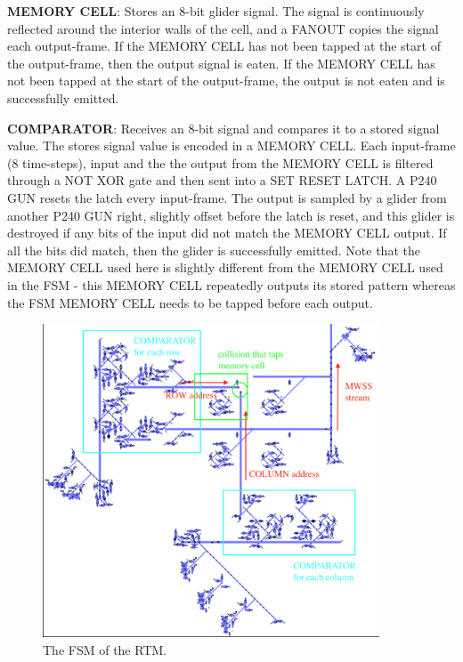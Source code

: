 \documentclass{article}
\begin{document}
\vspace{1em}

\noindent\textbf{MEMORY CELL}: Stores an 8-bit glider signal. The signal is continuously reflected around the interior walls of the cell, and a FANOUT copies the signal each output-frame. If the MEMORY CELL has not been tapped at the start of the output-frame, then the output signal is eaten. If the MEMORY CELL has not been tapped at the start of the output-frame, the output is not eaten and is successfully emitted.

\vspace{1em}

\noindent\textbf{COMPARATOR}: Receives an 8-bit signal and compares it to a stored signal value. The stores signal value is encoded in a MEMORY CELL. Each input-frame (8 time-steps), input and the the output from the MEMORY CELL is filtered through a NOT XOR gate and then sent into a SET RESET LATCH. A P240 GUN resets the latch every input-frame. The output is sampled by a glider from another P240 GUN right, slightly offset before the latch is reset, and this glider is destroyed if any bits of the input did not match the MEMORY CELL output. If all the bits did match, then the glider is successfully emitted. Note that the MEMORY CELL used here is slightly different from the MEMORY CELL used in the FSM - this MEMORY CELL repeatedly outputs its stored pattern whereas the FSM MEMORY CELL needs to be tapped before each output.

\vspace{1em}

\begin{figure}[h]
\centering
\includegraphics[width=10cm,keepaspectratio]{images/FSM.png}
\captionsetup{labelformat=empty} \caption{The FSM of the RTM.}
\end{figure}
\end{document}
